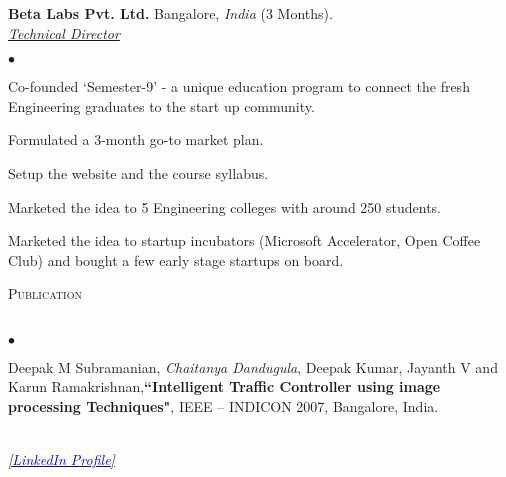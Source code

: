 \documentclass[a4paper]{article}
\newcommand{\lineunder}{\vspace*{-8pt} \\ \hspace*{-18pt} \hrulefill \\}
\newcommand{\header}[1]{{\hspace*{-15pt}\vspace*{6pt} \textsc{#1}} \vspace*{-6pt} \lineunder}
\newcommand{\employer}[4]{{ \textbf{#1} #2  (#3).\\ \underline{\emph{#4}}\\  }}
\newenvironment{achievements}{\begin{list}{$\bullet$}{\topsep 0pt \itemsep -2pt}}{\vspace*{4pt}\end{list}}
\begin{document}
\employer{Beta Labs Pvt. Ltd.}{Bangalore, \textit{India}}{3 Months}{Technical Director}
\begin{achievements}
\item Co-founded `Semester-9' - a unique education program to connect the fresh Engineering graduates to the start up community.
\item Formulated a 3-month go-to market plan.
\item Setup the website and the course syllabus.
\item Marketed the idea to 5 Engineering colleges with around 250 students.
\item Marketed the idea to startup incubators (Microsoft Accelerator, Open Coffee Club) and bought a few early stage startups on board.
\end{achievements}

\header{Publication}
\begin{achievements}
\item  Deepak M Subramanian, \emph{Chaitanya Dandugula}, Deepak Kumar, Jayanth V and Karun Ramakrishnan,\textbf{``Intelligent Traffic Controller using image processing Techniques"}, IEEE – INDICON 2007, Bangalore, India.
\end{achievements}

\hspace*{-18pt} \hrulefill \\
\textit{\href{https://www.linkedin.com/in/dandugula/}{[{\underline{\textcolor{blue}{LinkedIn Profile}}}]}}\\
\end{document}
